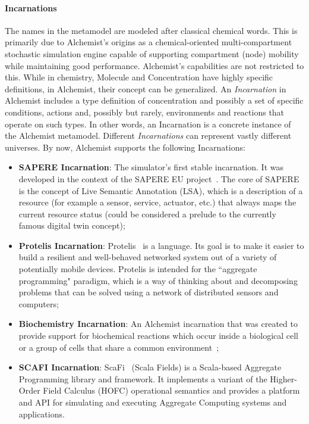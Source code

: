 
\paragraph{Incarnations} The names in the metamodel are modeled after classical chemical words. This is primarily due to Alchemist's origins as a chemical-oriented multi-compartment stochastic simulation engine capable of supporting compartment (node) mobility while maintaining good performance. Alchemist's capabilities are not restricted to this. While in chemistry, Molecule and Concentration have highly specific definitions, in Alchemist, their concept can be generalized. An \textit{Incarnation} in Alchemist includes a type definition of concentration and possibly a set of specific conditions, actions and, possibly but rarely, environments and reactions that operate on such types. In other words, an Incarnation is a concrete instance of the Alchemist metamodel.\newline
Different \textit{Incarnations} can represent vastly different universes. By now, Alchemist supports the following Incarnations:
\begin{itemize}
	\item \textbf{SAPERE Incarnation}: The simulator's first stable incarnation. It was developed in the context of the SAPERE EU project~\cite{SAPEREon48:online}. The core of SAPERE is the concept of Live Semantic Annotation (LSA), which is a description of a resource (for example a sensor, service, actuator, etc.) that always maps the current resource status (could be considered a prelude to the currently famous digital twin concept);
	\item \textbf{Protelis Incarnation}: Protelis~\cite{Protelis97:online} is a language. Its goal is to make it easier to build a resilient and well-behaved networked system out of a variety of potentially mobile devices. Protelis is intended for the ``aggregate programming" paradigm, which is a way of thinking about and decomposing problems that can be solved using a network of distributed sensors and computers;
	\item \textbf{Biochemistry Incarnation}: An Alchemist incarnation that was created to provide support for biochemical reactions which occur inside a biological cell or a group of cells that share a common environment~\cite{Biochemi16:online};
	\item \textbf{SCAFI Incarnation}: ScaFi~\cite{ScaFiAgg69:online} (Scala Fields) is a Scala-based Aggregate Programming library and framework. It implements a variant of the Higher-Order Field Calculus (HOFC) operational semantics and provides a platform and API for simulating and executing Aggregate Computing systems and applications.
\end{itemize}

